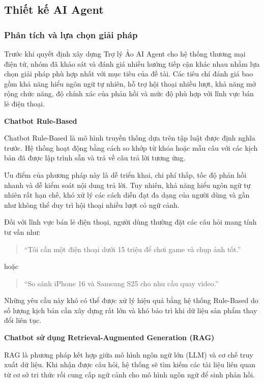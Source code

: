 \subsection{Thiết kế AI Agent}
\subsubsection{Phân tích và lựa chọn giải pháp}

Trước khi quyết định xây dựng Trợ lý Ảo AI Agent cho hệ thống thương mại điện tử, nhóm đã khảo sát và đánh giá nhiều hướng tiếp cận khác nhau nhằm lựa chọn giải pháp phù hợp nhất với mục tiêu của đề tài. Các tiêu chí đánh giá bao gồm khả năng hiểu ngôn ngữ tự nhiên, hỗ trợ hội thoại nhiều lượt, khả năng mở rộng chức năng, độ chính xác của phản hồi và mức độ phù hợp với lĩnh vực bán lẻ điện thoại.

\textbf{Chatbot Rule-Based}

Chatbot Rule-Based là mô hình truyền thống dựa trên tập luật được định nghĩa trước. Hệ thống hoạt động bằng cách so khớp từ khóa hoặc mẫu câu với các kịch bản đã được lập trình sẵn và trả về câu trả lời tương ứng.

Ưu điểm của phương pháp này là dễ triển khai, chi phí thấp, tốc độ phản hồi nhanh và dễ kiểm soát nội dung trả lời. Tuy nhiên, khả năng hiểu ngôn ngữ tự nhiên rất hạn chế, khó xử lý các cách diễn đạt đa dạng của người dùng và gần như không thể duy trì hội thoại nhiều lượt có ngữ cảnh.

Đối với lĩnh vực bán lẻ điện thoại, người dùng thường đặt các câu hỏi mang tính tư vấn như:

\begin{quote}
``Tôi cần một điện thoại dưới 15 triệu để chơi game và chụp ảnh tốt.''
\end{quote}

hoặc

\begin{quote}
``So sánh iPhone 16 và Samsung S25 cho nhu cầu quay video.''
\end{quote}

Những yêu cầu này khó có thể được xử lý hiệu quả bằng hệ thống Rule-Based do số lượng kịch bản cần xây dựng rất lớn và khó bảo trì khi dữ liệu sản phẩm thay đổi liên tục.

\textbf{Chatbot sử dụng Retrieval-Augmented Generation (RAG)}

RAG là phương pháp kết hợp giữa mô hình ngôn ngữ lớn (LLM) và cơ chế truy xuất dữ liệu. Khi nhận được câu hỏi, hệ thống sẽ tìm kiếm các tài liệu liên quan từ cơ sở tri thức rồi cung cấp ngữ cảnh cho mô hình ngôn ngữ để sinh phản hồi.

